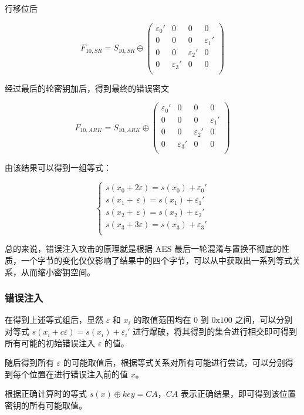 \documentclass[a4paper, zihao=-4, UTF-8]{ctexart}
\begin{document}
	行移位后
	
	$$F_{10,SR}=S_{10,SR}\oplus \left(\begin{matrix}
		\varepsilon_0' & 0 & 0 & 0\\
		0 & 0 & 0 & \varepsilon_1'\\
		0 & 0 & \varepsilon_2' & 0\\
		0 & \varepsilon_3' & 0 & 0\\
	\end{matrix}\right)$$
	
	经过最后的轮密钥加后，得到最终的错误密文
	
	$$F_{10,ARK}=S_{10,ARK}\oplus \left(\begin{matrix}
		\varepsilon_0' & 0 & 0 & 0\\
		0 & 0 & 0 & \varepsilon_1'\\
		0 & 0 & \varepsilon_2' & 0\\
		0 & \varepsilon_3' & 0 & 0\\
	\end{matrix}\right)$$
	
	由该结果可以得到一组等式：
	
	$$\begin{cases}
		s(x_0+2\varepsilon)=s(x_0)+\varepsilon_0'\\
		s(x_1+\ \varepsilon)=s(x_1)+\varepsilon_1'\\
		s(x_2+\ \varepsilon)=s(x_2)+\varepsilon_2'\\
		s(x_3+3\varepsilon)=s(x_3)+\varepsilon_3'\\
	\end{cases}$$
	
	总的来说，错误注入攻击的原理就是根据 AES 最后一轮混淆与置换不彻底的性质，一个字节的变化仅仅影响了结果中的四个字节，可以从中获取出一系列等式关系，从而缩小密钥空间。
	
	\subsubsection{错误注入}
	
	在得到上述等式组后，显然 $\varepsilon$ 和 $x_i$ 的取值范围均在 $0$ 到 $\mathrm{0x}100$ 之间，可以分别对等式 $s(x_i + c\varepsilon) = s(x_i) + \varepsilon_i'$ 进行爆破，将其得到的集合进行相交即可得到所有可能的初始错误注入 $\varepsilon$ 的值。
	
	随后得到所有 $\varepsilon$ 的可能取值后，根据等式关系对所有可能进行尝试，可以分别得到每个位置在进行错误注入前的值 $x$。
	
	根据正确计算时的等式 $s(x)\oplus key = CA$，$CA$ 表示正确结果，即可得到该位置密钥的所有可能取值。
	
\end{document}
